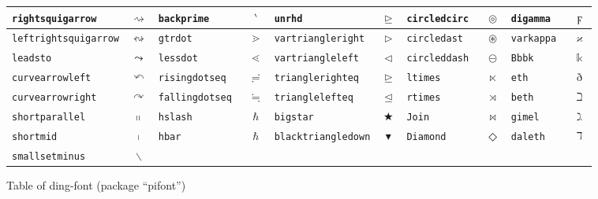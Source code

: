 \documentclass[10pt]{article}
\def\bs{\tt\char92}
\begin{document}
{\begin{tabular}{|l|c||l|c||l|c||l|c||l|c|}
     \bs rightsquigarrow    &$\rightsquigarrow    $ & \bs backprime        &$\backprime        $& \bs unrhd            &$\unrhd            $ &\bs circledcirc       &$\circledcirc       $& \bs digamma         &$\digamma         $\\   \hline
     \bs leftrightsquigarrow&$\leftrightsquigarrow$ & \bs gtrdot           &$\gtrdot           $& \bs vartriangleright &$\vartriangleright $ &\bs circledast        &$\circledast        $& \bs varkappa        &$\varkappa        $\\   \hline
     \bs leadsto            &$\leadsto            $ & \bs lessdot          &$\lessdot          $& \bs vartriangleleft  &$\vartriangleleft  $ &\bs circleddash       &$\circleddash       $& \bs Bbbk            &$\Bbbk            $\\   \hline%
     \bs curvearrowleft     &$\curvearrowleft     $ & \bs risingdotseq     &$\risingdotseq     $& \bs trianglerighteq  &$\trianglerighteq  $ &\bs ltimes            &$\ltimes            $& \bs eth             &$\eth             $\\   \hline%
     \bs curvearrowright    &$\curvearrowright    $ & \bs fallingdotseq    &$\fallingdotseq    $& \bs trianglelefteq   &$\trianglelefteq   $ &\bs rtimes            &$\rtimes            $& \bs beth            &$\beth            $\\   \hline%
     \bs shortparallel      &$\shortparallel      $ & \bs hslash           &$\hslash           $& \bs bigstar          &$\bigstar          $ &\bs Join              &$\Join              $& \bs gimel           &$\gimel           $\\   \hline%
     \bs shortmid           &$\shortmid           $ & \bs hbar             &$\hbar             $& \bs blacktriangledown&$\blacktriangledown$ &\bs Diamond           &$\Diamond           $& \bs daleth          &$\daleth          $\\   \hline%
     \bs smallsetminus      &$\smallsetminus      $ &                              &$                  $&                              &$                  $ &                              &$                   $&                             &$                 $\\   \hline
  \end{tabular}
  }
\newpage
\centerline{Table of ding-font (package ``pifont'')}
\bigskip
\end{document}
